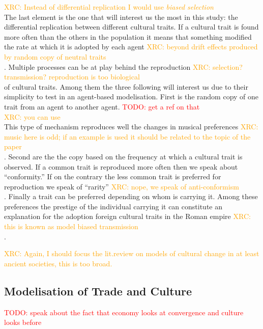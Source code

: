 \documentclass{wscpaperproc}
\newcommand{\memo}[2]{\textcolor{#1}{#2}}
\newcommand{\todo}[1]{\memo{red}{TODO: #1\\}}
\newcommand{\xrc}[1]{\memo{orange}{XRC: #1\\}}
\begin{document}
\xrc{Instead of differential replication I would use \emph{biased selection}}
The last element is the one that will interest us the most in this study: the differential replication between different cultural traits. If a cultural trait is found more often than the others in the population it means that something modified the rate at which it is adopted by each agent \xrc{beyond drift effects produced by random copy of neutral traits \cite{bentley_2004}}.
Multiple processes can be at play behind the reproduction \xrc{selection? transmission? reproduction is too biological} of cultural traits. Among them the three following will interest us due to their simplicity to test in an agent-based modelisation. First is the random copy of one trait from an agent to another agent. 
\todo{get a ref on that} \xrc{you can use \cite{bentley_2004}}
This type of mechanism reproduces well the changes in musical preferences \xrc{music here is odd; if an example is used it should be related to the topic of the paper}. Second are the the copy based on the frequency at which a cultural trait is observed. If a common trait is reproduced more often then we speak about ``conformity.'' If on the contrary the less common trait is preferred for reproduction we speak of ``rarity'' \xrc{nope, we speak of anti-conformism}. Finally a trait can be preferred depending on whom is carrying it. Among these preferences the prestige of the individual carrying it can constitute an explanation for the adoption foreign cultural traits in the Roman empire \xrc{this is known as model biased transmission}.

\xrc{Again, I should focus the lit.review on models of cultural change in at least ancient societies, this is too broad.}

\subsection{Modelisation of Trade and Culture}

\todo{speak about the fact that economy looks at convergence and culture looks before}
\end{document}
